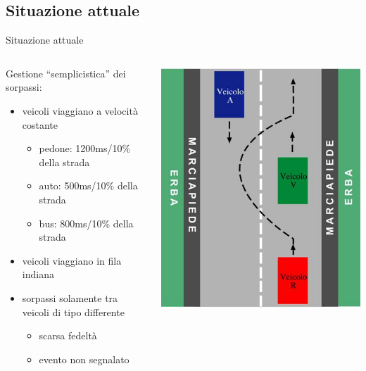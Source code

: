 \subsection{Situazione attuale}
\begin{frame}{Situazione attuale}
	\only<1>
	{
		\begin{columns}
			\begin{column}{0.7\textwidth}
				Gestione ``semplicistica'' dei sorpassi:
				\begin{itemize}
					\item{\footnotesize{veicoli viaggiano a velocità costante}}
					\begin{itemize}
						\item{\scriptsize{pedone: 1200ms/10\% della strada}}
						\item{\scriptsize{auto: 500ms/10\% della strada}}
						\item{\scriptsize{bus: 800ms/10\% della strada}}
					\end{itemize}
					\item{\footnotesize{veicoli viaggiano in fila indiana}}
					\item{\footnotesize{sorpassi solamente tra veicoli di tipo differente}}
					\begin{itemize}
						\item{\scriptsize{scarsa fedeltà}}
						\item{\scriptsize{evento non segnalato}}
					\end{itemize}
				\end{itemize}
			\end{column}
			\begin{column}{0.3\textwidth}
				\centering
				\includegraphics[scale=0.2,angle=-90]{images/overtaking.png}

\end{column}
\end{columns}}
\end{frame}
